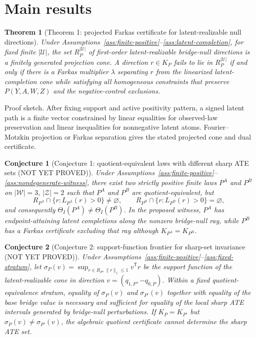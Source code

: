 \documentclass[11pt]{article}
\newcommand{\transpose}{\mathsf{T}}
\theoremstyle{definition}
\theoremstyle{plain}
\newtheorem{theorem}{Theorem}
\newtheorem{conjecture}{Conjecture}
\theoremstyle{remark}
\begin{document}
\section{Main results}
\begin{theorem}[Theorem 1: projected Farkas certificate for latent-realizable null directions]\label{thm:farkas-cone}
Under Assumptions~\ref{ass:finite-positive}--\ref{ass:latent-completion}, for fixed finite \(|\mathcal U|\), the set \(R_P^{|\mathcal U|}\) of first-order latent-realizable bridge-null directions is a finitely generated projection cone. A direction \(r\in K_P\) fails to lie in \(R_P^{|\mathcal U|}\) if and only if there is a Farkas multiplier \(\lambda\) separating \(r\) from the linearized latent-completion cone while satisfying all homogeneous constraints that preserve \(P(Y,A,W,Z)\) and the negative-control exclusions.
\end{theorem}
Proof sketch. After fixing support and active positivity pattern, a signed latent path is a finite vector constrained by linear equalities for observed-law preservation and linear inequalities for nonnegative latent atoms. Fourier--Motzkin projection or Farkas separation gives the stated projected cone and dual certificate.

\begin{conjecture}[Conjecture 1: quotient-equivalent laws with different sharp ATE sets (NOT YET PROVED)]\label{conj:nonequivalence}
Under Assumptions~\ref{ass:finite-positive}--\ref{ass:nondegenerate-witness}, there exist two strictly positive finite laws \(P^A\) and \(P^B\) on \(|\mathcal W|=3\), \(|\mathcal Z|=2\) such that \(P^A\) and \(P^B\) are quotient-equivalent, but
\[
R_{P^A}\cap\{r:L_{P^A}(r)>0\}\ne\varnothing,
\qquad
R_{P^B}\cap\{r:L_{P^B}(r)>0\}=\varnothing,
\]
and consequently \(\Theta_I(P^A)\ne\Theta_I(P^B)\). In the proposed witness, \(P^A\) has endpoint-attaining latent completions along the nonzero bridge-null ray, while \(P^B\) has a Farkas certificate excluding that ray although \(K_{P^A}=K_{P^B}\).
\end{conjecture}

\begin{conjecture}[Conjecture 2: support-function frontier for sharp-set invariance (NOT YET PROVED)]\label{conj:support-frontier}
Under Assumptions~\ref{ass:finite-positive}--\ref{ass:fixed-stratum}, let \(\sigma_P(v)=\sup_{r\in R_P,\|r\|_1\le1} v^{\transpose}r\) be the support function of the latent-realizable cone in direction \(v=(q_{1,P},-q_{0,P})\). Within a fixed quotient-equivalence stratum, equality of \(\sigma_P(v)\) and \(\sigma_{P'}(v)\) together with equality of the base bridge value is necessary and sufficient for equality of the local sharp ATE intervals generated by bridge-null perturbations. If \(K_P=K_{P'}\) but \(\sigma_P(v)\ne\sigma_{P'}(v)\), the algebraic quotient certificate cannot determine the sharp ATE set.
\end{conjecture}
\end{document}
